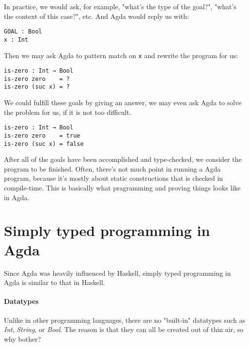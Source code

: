 \documentclass[../thesis.tex]{subfiles}
\begin{document}
In practice, we would ask, for example, "what's the type of the goal?",
 "what's the context of this case?", etc. And Agda would reply us with:

\begin{lstlisting}
GOAL : Bool
x : Int
\end{lstlisting}

Then we may ask Agda to pattern match on {\lstinline|x|} and rewrite the program for us: 

\begin{lstlisting}
is-zero : Int → Bool
is-zero zero    = ?
is-zero (suc x) = ?
\end{lstlisting}

We could fulfill these goals by giving an answer, we may even ask Agda to solve
the problem for us, if it is not too difficult. 

\begin{lstlisting}
is-zero : Int → Bool
is-zero zero    = true
is-zero (suc x) = false
\end{lstlisting}

After all of the goals have been accomplished and type-checked, we consider the
program to be finished. Often, there's not much point in running a Agda program,
because it's mostly about static constructions that is checked in compile-time.
This is basically what pragramming  and proving things looks like in Agda.


\section{Simply typed programming in Agda}

Since Agda was heavily influenced by Haskell, simply typed programming in Agda
is similar to that in Haskell.

\paragraph{Datatypes}

Unlike in other programming languages, there are no "built-in"
datatypes such as \textit{Int}, \textit{String}, or \textit{Bool}.
The reason is that they can all be created out of thin air, so why bother?
\end{document}
